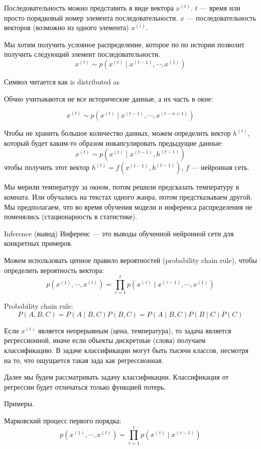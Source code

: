 Последовательность можно представить в виде вектора $x^{(t)}$. $t$ --- время
или просто порядковый номер элемента последовательности. $x$ ---
последовательность векторов (возможно из одного элемента) $x^{(i)}$.

Мы хотим получить условное распределение, которое по по истории позволит
получить следующий элемент последовательности.
\[
    x^{(t)} \sim p \left( x^{(t)} \mid x^{(t-1)}, \cdots, x^{(1)} \right)
\]

Символ читается как is distributed as

Обчно учитываются не все исторические данные, а их часть в окне:

\[
    x^{(t)} \sim p \left( x^{(t)} \mid x^{(t-1)}, \cdots, x^{(t-n+1)} \right)
\]

Чтобы не хранить большое количество данных, можем определить вектор $h^{(t)}$,
который будет каким-то образом инкапсулировать предыдущие данные:
\[
    x^{(t)} \sim p \left( x^{(t)} \mid x^{(t-1)}, h^{(t-1)} \right)
\]
чтобы получить этот вектор  $h^{(t)} = f\left( x^{(t-1)}, h^{(t-1)} \right)$,
$f$ --- нейронная сеть.

Мы мерили температуру за окном, потом решили предсказать температуру в комната.
Или обучались на текстах одного жанра, потом предстказываем другой. Мы
предполагаем, что во время обучения модели и инференса распределения не
поменялись (стационарность в статистике).

Inference (вывод) Инференс --- это выводы обученной нейронной сети для конкретных примеров.

Можем использовать цепное правило вероятностей (probability chain rule), чтобы
определить вероятность вектора:
\[
    p\left( x^{(1)}, \cdots, x^{(t)} \right) = \prod_{\tau = 1}^{t} p \left(
    x^{(\tau)} \mid x^{(\tau - 1)}, \cdots, x^{(1)} \right)
\]

Probability chain rule:
\[
    P(A, B, C) = P(A \mid B, C) P(B, C) = P(A \mid B, C) P(B \mid C) P(C)
\]

Если $x^{(t)}$ является непрерывным (цена, температура), то задача является
регрессионной, иначе если объекты дискретные (слова) получаем классификацию.
В задаче классификации могут быть тысячи классов, несмотря на то, что ощущается
такая зада как регрессионная.

Далее мы будем рассматривать задачу классификации. Классификация от регрессии
будет отличаться только функцией потерь.

Примеры.

Марковский процесс первого порядка:
\[
    p\left( x^{(1)}, \cdots, x^{(t)} \right) = \prod_{\tau = 1}^{t} p \left(
    x^{(\tau)} \mid x^{(\tau - 1)} \right)
\]

